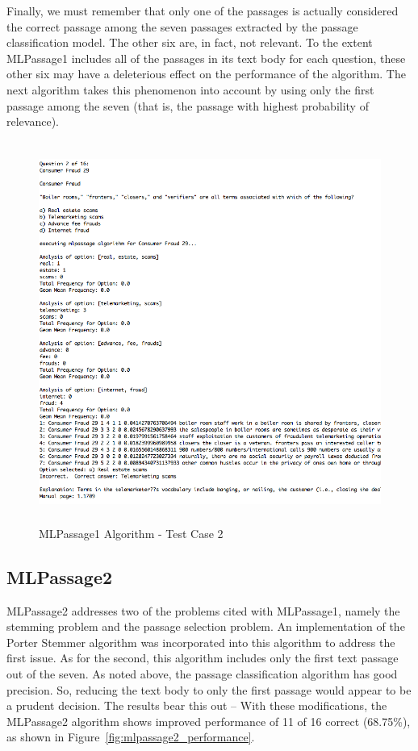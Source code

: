 Finally, we must remember that only one of the passages is actually considered the correct passage among the seven passages extracted by the passage classification model.  The other six are, in fact, not relevant.  To the extent MLPassage1 includes all of the passages in its text body for each question, these other six may have a deleterious effect on the performance of the algorithm.  The next algorithm takes this phenomenon into account by using only the first passage among the seven (that is, the passage with highest probability of relevance).

\begin{figure}
\centering
\vspace{1.0in}
\includegraphics[width=125mm, height=125mm]{mlpassage1_test_case_incorrect.png}
\caption{MLPassage1 Algorithm - Test Case 2}
\label{fig:mlpassage1_test_case_incorrect}
\end{figure}


\subsection{MLPassage2}

MLPassage2 addresses two of the problems cited with MLPassage1, namely the stemming problem and the passage selection problem.  An implementation of the Porter Stemmer algorithm was incorporated into this algorithm to address the first issue.  As for the second, this algorithm includes only the first text passage out of the seven.  As noted above, the passage classification algorithm has good precision.  So, reducing the text body to only the first passage would appear to be a prudent decision.  The results bear this out -- With these modifications, the MLPassage2 algorithm shows improved performance of 11 of 16 correct (68.75\%), as shown in Figure~\ref{fig:mlpassage2_performance}.  

